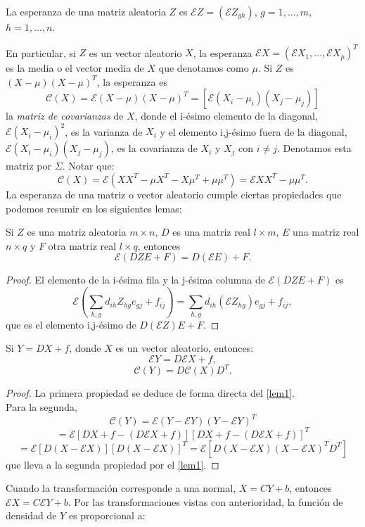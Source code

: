 \begin{definicion}
La esperanza de una matriz aleatoria $Z$ es $\mathcal{E}Z=(\mathcal{E}Z_{gh})$, $g=1,...,m$, $h=1,...,n$.
\end{definicion}
En particular, si $Z$ es un vector aleatorio $X$, la esperanza $\mathcal{E}X=(\mathcal{E}X_1,...,\mathcal{E}X_p)^T$ es la media o el vector media de $X$ que denotamos como $\mu$. Si $Z$ es $(X-\mu)(X-\mu)^T$, la esperanza es
\[ \mathcal{C}(X)=\mathcal{E}(X-\mu)(X-\mu)^T = [ \mathcal{E}(X_i-\mu_i)(X_j-\mu_j) ] \]
la \textit{matriz de covarianzas} de $X$, donde el i-ésimo elemento de la diagonal, $\mathcal{E}(X_i-\mu_i)^2$, es la varianza de $X_i$ y el elemento i,j-ésimo fuera de la diagonal, $\mathcal{E}(X_i-\mu_i)(X_j-\mu_j)$, es la covarianza de $X_i$ y $X_j$ con $i \neq j$. Denotamos esta matriz por $\Sigma$. Notar que:
\[ \mathcal{C}(X)=\mathcal{E}(XX^T-\mu X^T - X\mu^T + \mu\mu^T) = \mathcal{E}XX^T - \mu\mu^T . \]
La esperanza de una matriz o vector aleatorio cumple ciertas propiedades que podemos resumir en los siguientes lemas:
\begin{lema}\label{lem1}
Si $Z$ es una matriz aleatoria $m \times n$, $D$ es una matriz real $l \times m$, $E$ una matriz real $n \times q$ y $F$ otra matriz real $l \times q$, entonces
\[ \mathcal{E}(DZE+F)=D(\mathcal{E}E)+F. \]
\end{lema}
\begin{proof}
El elemento de la i-ésima fila y la j-ésima columna de $\mathcal{E}(DZE+F)$ es 
\[ \mathcal{E} \left( \sum_{h,g} d_{ih}Z_{hg}e_{gj}+f_{ij} \right) = \sum_{h,g} d_{ih}(\mathcal{E}Z_{hg})e_{gj} + f_{ij}, \]
que es el elemento i,j-ésimo de $D(\mathcal{E}Z)E+F$.
\end{proof}
\begin{lema}\label{lem2}
Si $Y=DX+f$, donde $X$ es un vector aleatorio, entonces:
\[ \mathcal{E}Y=D \mathcal{E}X+f, \]
\[ \mathcal{C}(Y)=D\mathcal{C}(X)D^T. \]
\end{lema}
\begin{proof}
La primera propiedad se deduce de forma directa del \autoref{lem1}.\\
Para la segunda,
\[ \mathcal{C}(Y)=\mathcal{E}(Y-\mathcal{E}Y)(Y-\mathcal{E}Y)^T \]
\[ =\mathcal{E}[DX+f-(D\mathcal{E}X+f)][DX+f-(D\mathcal{E}X+f)]^T \]
\[ =\mathcal{E}[D(X-\mathcal{E}X)][D(X-\mathcal{E}X)]^T=\mathcal{E}[D(X-\mathcal{E}X)(X-\mathcal{E}X)^TD^T] \]
que lleva a la segunda propiedad por el \autoref{lem1}.
\end{proof}
Cuando la transformación corresponde a una normal, $X=CY+b$, entonces $\mathcal{E}X=C\mathcal{E}Y+b$. Por las transformaciones vistas con anterioridad, la función de densidad de $Y$ es proporcional a:
